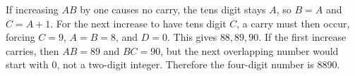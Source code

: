 If increasing $AB$ by one causes no carry, the tens digit stays $A$, so $B=A$ and $C=A+1$. For the next increase to have tens digit $C$, a carry must then occur, forcing $C=9$, $A=B=8$, and $D=0$. This gives $88,89,90$. If the first increase carries, then $AB=89$ and $BC=90$, but the next overlapping number would start with $0$, not a two-digit integer. Therefore the four-digit number is $\boxed{8890}$.
